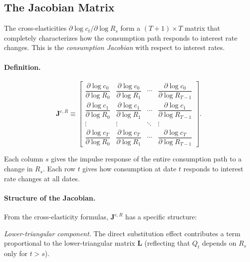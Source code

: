 \subsection{The Jacobian Matrix}
\label{subsec:jacobian}

The cross-elasticities $\partial \log c_t / \partial \log R_s$ form a $(T+1) \times T$ matrix that completely characterizes how the consumption path responds to interest rate changes. This is the \emph{consumption Jacobian} with respect to interest rates.

\paragraph{Definition.}
\begin{equation}
\mathbf{J}^{c,R} \equiv \begin{bmatrix} \dfrac{\partial \log c_0}{\partial \log R_0} & \dfrac{\partial \log c_0}{\partial \log R_1} & \cdots & \dfrac{\partial \log c_0}{\partial \log R_{T-1}} \\[10pt]
\dfrac{\partial \log c_1}{\partial \log R_0} & \dfrac{\partial \log c_1}{\partial \log R_1} & \cdots & \dfrac{\partial \log c_1}{\partial \log R_{T-1}} \\[10pt]
\vdots & \vdots & \ddots & \vdots \\[6pt]
\dfrac{\partial \log c_T}{\partial \log R_0} & \dfrac{\partial \log c_T}{\partial \log R_1} & \cdots & \dfrac{\partial \log c_T}{\partial \log R_{T-1}}
\end{bmatrix}.
\label{eq:jacobian-def}
\end{equation}

Each column $s$ gives the impulse response of the entire consumption path to a change in $R_s$. Each row $t$ gives how consumption at date $t$ responds to interest rate changes at all dates.

\paragraph{Structure of the Jacobian.}
From the cross-elasticity formulas, $\mathbf{J}^{c,R}$ has a specific structure:

\medskip
\noindent
\textit{Lower-triangular component.} The direct substitution effect contributes a term proportional to the lower-triangular matrix $\mathbf{L}$ (reflecting that $Q_t$ depends on $R_s$ only for $t > s$).

